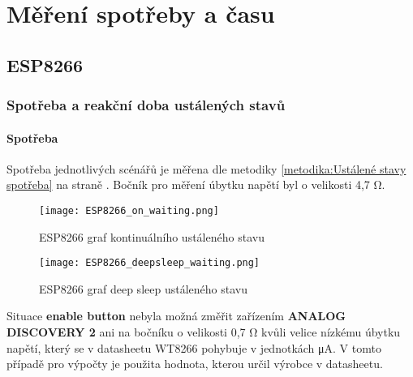 \documentclass[a4paper, 12pt]{report}
\begin{document}

	\chapter{Měření spotřeby a času}
		\section{ESP8266}
			\subsection{Spotřeba a reakční doba ustálených stavů}
				\subsubsection{Spotřeba}
					Spotřeba jednotlivých scénářů je měřena dle metodiky \ref{metodika:Ustálené stavy spotřeba} na straně \pageref{metodika:Ustálené stavy spotřeba}. Bočník pro měření úbytku napětí byl o velikosti 4,7 \si{\ohm}. \\

					\begin{figure}[h]
						\centering
						\texttt{[image: ESP8266\_on\_waiting.png]}
						\caption{ESP8266 graf kontinuálního ustáleného stavu }
						\label{ESP8266_on_waiting}
					\end{figure}
					\begin{figure}[h]
						\centering
						\texttt{[image: ESP8266\_deepsleep\_waiting.png]}
						\caption{ESP8266 graf deep sleep ustáleného stavu}
						\label{ESP8266_on_waiting}
					\end{figure}

					Situace {\bf enable button} nebyla možná změřit zařízením {\bf ANALOG DISCOVERY 2} ani na bočníku o velikosti 0,7 \si{\ohm} kvůli velice nízkému úbytku napětí, který se v datasheetu WT8266 pohybuje v jednotkách \si{\micro A}. V tomto případě pro výpočty je použita hodnota, kterou určil výrobce v datasheetu.
\end{document}
